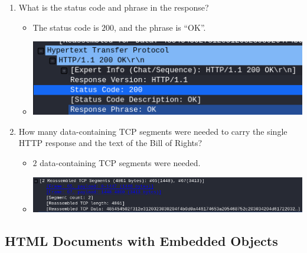 \documentclass[11pt]{article}
\begin{document}
\begin{enumerate}
\begin{itemize}
  \end{itemize}
\item What is the status code and phrase in the response?
  \begin{itemize}
  \item The status code is $200$, and the phrase is ``OK''.
  \item \includegraphics[width=\textwidth]{img/ws-long-doc-status-code-phrase}
  \end{itemize}
\item How many data-containing TCP segments were needed to carry the single HTTP
  response and the text of the Bill of Rights?
  \begin{itemize}
  \item $2$ data-containing TCP segments were needed.
  \item \includegraphics[width=\textwidth]{img/ws-long-doc-tcp-count}
  \end{itemize}
\end{enumerate}


\subsection{HTML Documents with Embedded Objects}
\end{document}
